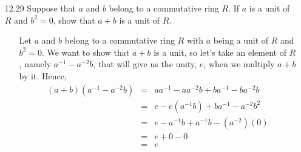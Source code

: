 \documentclass[12pt]{article}
\begin{document}
\begin{enumerate}
\item[12.29] Suppose that $a$ and $b$ belong to a commutative ring $R$. If $a$ is a unit of $R$ and $b^2 = 0$,
show that $a + b$ is a unit of $R$.
\begin{enumerate}
\item[] Let $a$ and $b$ belong to a commutative ring $R$ with $a$ being a unit of $R$ and 
$b^2 = 0$. We want to show that $a + b$ is a unit, so let's take an element of $R$, namely
$a^{-1} - a^{-2}b$, that will give us the unity, $e$, when we multiply $a + b$ by it. Hence,
\begin{eqnarray*}
(a + b)(a^{-1} - a^{-2}b) &=& aa^{-1} - aa^{-2}b + ba^{-1} - ba^{-2}b \\
&=& e - e(a^{-1}b) + ba^{-1} - a^{-2}b^2 \\
&=& e - a^{-1}b + a^{-1}b - (a^{-2})(0) \\
&=& e + 0 - 0 \\
&=& e
\end{eqnarray*}
\end{enumerate}


\end{enumerate}
\end{document}
